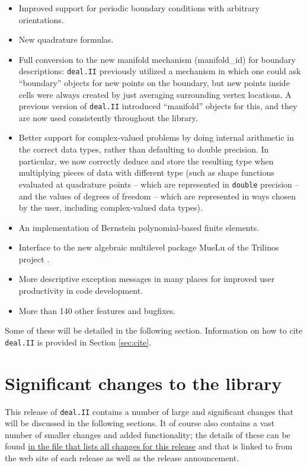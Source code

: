 \documentclass{ansarticle-preprint}
\newcommand{\specialword}[1]{\texttt{#1}}
\newcommand{\dealii}{{\specialword{deal.II}}}
\begin{document}
\begin{itemize}
\item Improved support for periodic boundary conditions with arbitrary
  orientations.
\item New quadrature formulas.
\item Full conversion to the new manifold mechanism (manifold\_id) for boundary
  descriptions: \dealii{} previously utilized a mechanism in which one could
  ask ``boundary'' objects for new points on the boundary, but new points
  inside cells were always created by just averaging surrounding vertex
  locations. A previous version of \dealii{} introduced ``manifold'' objects
  for this, and they are now used consistently throughout the library.
\item Better support for complex-valued problems by doing internal arithmetic in
  the correct data types, rather than defaulting to double precision. In
  particular, we now correctly deduce and store the resulting type when
  multiplying pieces of data with different type (such as shape functions
  evaluated at quadrature points -- which are represented in \texttt{double}
  precision -- and the values of degrees of freedom -- which are represented
  in ways chosen by the user, including complex-valued data types).
\item An implementation of Bernstein polynomial-based finite elements.
\item Interface to the new algebraic multilevel package MueLu of the
  Trilinos project \cite{trilinos-web-page}.
\item More descriptive exception messages in many places for improved user
  productivity in code development.
\item  More than 140 other features and bugfixes.
\end{itemize}
Some of these will be detailed in the following section.
Information on how to cite \dealii{} is provided in Section \ref{sec:cite}.


\section{Significant changes to the library}

This release of \dealii{} contains a number of large and significant changes
that will be discussed in the following sections. It of course also contains a
vast number of smaller changes and added functionality; the details of these
can be found
\href{https://www.dealii.org/8.3.0/doxygen/deal.II/changes_between_8_2_1_and_8_3.html}{in the file that lists all changes for this release}
and that is linked to from the web site of each release as well as the
release announcement.
\end{document}
